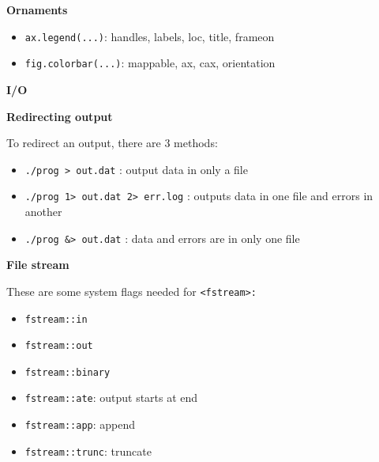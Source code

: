 \documentclass[fontsize=8pt, a4paper, landscape, fleqn]{scrartcl}
\renewcommand{\section}[1]{%
    \noindent\colorbox{sectioncolor}{%
        \parbox{\dimexpr\columnwidth-2\fboxsep}{\color{white}\textbf{#1}}}%
    \vspace{0.5mm}%
}
\renewcommand{\subsection}[1]{%
    \noindent\colorbox{subsectioncolor}{%
        \parbox{\dimexpr\columnwidth-2\fboxsep}{\color{white}\textbf{#1}}}%
    \vspace{0.5mm}%
}
\begin{document}
\begin{multicols*}{3}[\raggedcolumns]
    \subsection{Ornaments}
    \begin{itemize}
        \item \lstinline{ax.legend(...)}: handles, labels, loc, title, frameon 
        \item \lstinline{fig.colorbar(...)}: mappable, ax, cax, orientation

    \end{itemize}
    
    \section{I/O}
    \subsection{Redirecting output}
    To redirect an output, there are 3 methods:
    \begin{itemize}
        \item \lstinline{./prog > out.dat} : output data in only a file
        \item \lstinline{./prog 1> out.dat 2> err.log} : outputs data in one file and errors in another
        \item \lstinline{./prog &> out.dat} : data and errors are in only one file
    \end{itemize}
    
    
    \subsection{File stream}
    These are some system flags needed for \lstinline{<fstream>:}
    \begin{multicols}{2}
    \begin{itemize}
        \item \lstinline{fstream::in}
        \item \lstinline{fstream::out}
        \item \lstinline{fstream::binary}
        \item \lstinline{fstream::ate}: output starts at end
        \item \lstinline{fstream::app}: append
        \item \lstinline{fstream::trunc}: truncate
    \end{itemize}
    \end{multicols}
    

\end{multicols*}
\end{document}
